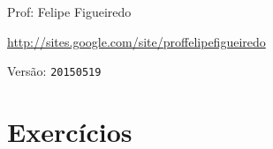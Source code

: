 \documentclass[a4paper]{article}
\begin{document}
\parbox[c]{.825\textwidth}{\raggedright%
{Prof: Felipe Figueiredo\par}
{\url{http://sites.google.com/site/proffelipefigueiredo}\par}
}

Versão: \verb|20150519|




\section{Exercícios}
\end{document}
